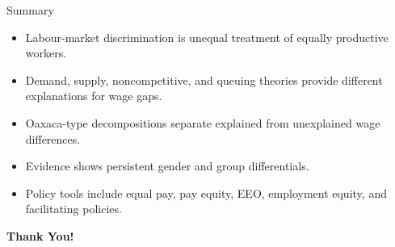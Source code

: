 \documentclass[aspectratio=169]{beamer}
\begin{document}
\begin{frame}{Summary}
\transfade
\begin{itemize}
  \item Labour-market discrimination is unequal treatment of equally productive workers.
  \item Demand, supply, noncompetitive, and queuing theories provide different explanations for wage gaps.
  \item Oaxaca-type decompositions separate explained from unexplained wage differences.
  \item Evidence shows persistent gender and group differentials.
  \item Policy tools include equal pay, pay equity, EEO, employment equity, and facilitating policies.
\end{itemize}


\end{frame}

\begin{frame}
\centering
\Huge{\textbf{Thank You!}}
\end{frame}
\end{document}
